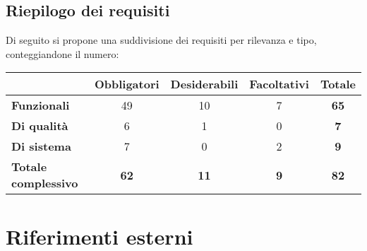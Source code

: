 \subsection{Riepilogo dei requisiti}\label{subsec:riepilogo}
Di seguito si propone una suddivisione dei requisiti per rilevanza e tipo, conteggiandone il numero:

\begin{table}[h]
    \centering
    \renewcommand\tabularxcolumn[1]{m{#1}} %
    \renewcommand{\arraystretch}{1.5}
    \begin{tabular}{|l|c|c|c||c|}
        \hline
        \rowcolor{black}
        \multicolumn{1}{|c|}{\cellcolor{white}Tipo\textbackslash Priorità} & \textbf{\color{white}Obbligatori} & \textbf{\color{white}Desiderabili} & \textbf{\color{white}Facoltativi} & \textbf{\color{white}Totale}\\ 
        \hline

        \cellcolor{black} \textbf{\color{white}Funzionali} & 49 & 10 & 7 & \textbf{65}\\
        \cellcolor{black} \textbf{\color{white}Di qualità} & 6 & 1 & 0 & \textbf{7}\\
        \cellcolor{black} \textbf{\color{white}Di sistema} & 7 & 0 & 2 & \textbf{9}\\

        \hline\hline
        \cellcolor{black} \textbf{\color{white}Totale complessivo} & \textbf{62} & \textbf{11} & \textbf{9} & \textbf{82}\\
        \hline
    \end{tabular}
\end{table}


\newpage
\section{Riferimenti esterni}\label{sec:riferimenti}

